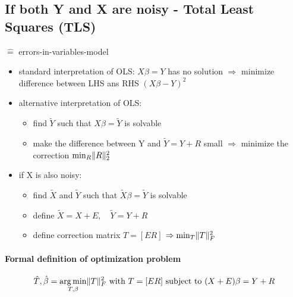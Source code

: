 \documentclass[11pt]{article}
\DeclareMathOperator*{\argmin}{arg\,min}
\DeclarePairedDelimiter\norm{\lVert}{\rVert}
\begin{document}
    \subsection{If both Y and X are noisy - Total Least Squares (TLS)} $\hat{=}$
      errors-in-variables-model
      \begin{itemize}
        \item standard interpretation of OLS: $X\beta=Y$ has no solution
          $\Rightarrow$ minimize difference between LHS ans RHS $(X\beta-Y)^2$
        \item alternative interpretation of OLS:
        \begin{itemize}
          \item find $\tilde{Y}$ such that $X\beta=\tilde{Y}$ is solvable
          \item make the difference between Y and $\tilde{Y}=Y+R$ small
          $\Rightarrow$ minimize the correction $\min_R \norm{R}_2^2$
        \end{itemize}
        \item if X is also noisy:
        \begin{itemize}
          \item find $\tilde{X}$ and $\tilde{Y}$ such that $\tilde{X}\beta=\tilde{Y}$
          is solvable
          \item define $\tilde{X}=X+E, \quad \tilde{Y}=Y+R$
          \item define correction matrix $T=[E R]$ $\Rightarrow \min_T \norm{T}_F^2$
        \end{itemize}
      \end{itemize}
      \paragraph{Formal definition of optimization problem}
      \begin{equation*}
        \hat{T}, \hat{\beta} = \argmin_{T, \beta} \norm{T}_F^2 \text{ with } T=[E R]
        \text{ subject to } (X+E)\beta=Y+R
      \end{equation*}
\end{document}
